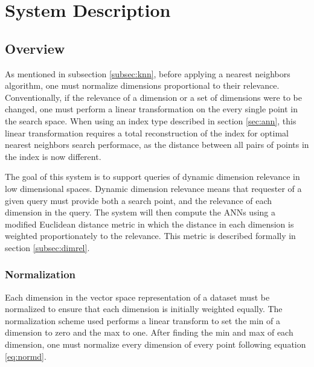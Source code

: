 \chapter{System Description} %

\label{sysdes} %


\section{Overview}
\label{sect:sysdesover}

As mentioned in subsection \ref{subsec:knn}, before applying a nearest neighbors algorithm, one must normalize dimensions proportional to their relevance.  Conventionally, if the relevance of a dimension or a set of dimensions were to be changed, one must perform a linear transformation on the every single point in the search space.  When using an index type described in section \ref{sec:ann}, this linear transformation requires a total reconstruction of the index for optimal nearest neighbors search performace, as the distance between all pairs of points in the index is now different.

The goal of this system is to support queries of dynamic dimension relevance in low dimensional spaces.  Dynamic dimension relevance means that requester of a given query must provide both a search point, and the relevance of each dimension in the query.  The system will then compute the ANNs using a modified Euclidean distance metric in which the distance in each dimension is weighted proportionately to the relevance.  This metric is described formally in section \ref{subsec:dimrel}.

\subsection{Normalization}
\label{subsec:normalization}

Each dimension in the vector space representation of a dataset must be normalized to ensure that each dimension is initially weighted equally.  The normalization scheme used performs a linear transform to set the min of a dimension to zero and the max to one.  After finding the min and max of each dimension, one must normalize every dimension of every point following equation \ref{eq:normd}.

